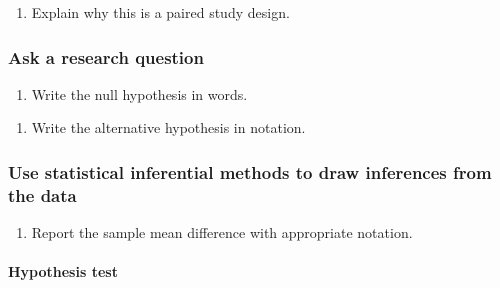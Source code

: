 \documentclass[
]{report}
\providecommand{\tightlist}{%
  \setlength{\itemsep}{0pt}\setlength{\parskip}{0pt}}
\begin{document}
\begin{enumerate}
\def\labelenumi{\arabic{enumi}.}
\setcounter{enumi}{1}
\tightlist
\item
  Explain why this is a paired study design.
\end{enumerate}

\vspace{0.6in}

\subsubsection*{Ask a research question}\label{ask-a-research-question-4}

\begin{enumerate}
\def\labelenumi{\arabic{enumi}.}
\setcounter{enumi}{2}
\tightlist
\item
  Write the null hypothesis in words.
\end{enumerate}

\vspace{0.8in}

\begin{enumerate}
\def\labelenumi{\arabic{enumi}.}
\setcounter{enumi}{3}
\tightlist
\item
  Write the alternative hypothesis in notation.
\end{enumerate}

\vspace{0.3in}

\subsubsection*{Use statistical inferential methods to draw inferences from the data}\label{use-statistical-inferential-methods-to-draw-inferences-from-the-data-2}

\begin{enumerate}
\def\labelenumi{\arabic{enumi}.}
\setcounter{enumi}{4}
\tightlist
\item
  Report the sample mean difference with appropriate notation.
\end{enumerate}

\vspace{0.2in}

\paragraph*{Hypothesis test}\label{hypothesis-test-3}
\end{document}
